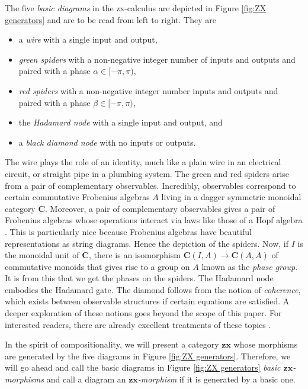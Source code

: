 \documentclass[11pt]{amsart}
\newcommand{\cat}[1]{\mathbf{#1}}
\theoremstyle{remark}
\theoremstyle{definition}
\begin{document}
The five \emph{basic diagrams} in the zx-calculus are depicted in Figure \ref{fig:ZX generators} and are to be read from left to right. They are
\begin{itemize}
	\item a \emph{wire} with a single input and output,
	\item \emph{green spiders} with a non-negative integer number of inputs and outputs and paired with a phase $\alpha \in [-\pi,\pi)$,
	\item \emph{red spiders} with a non-negative integer number inputs and outputs and paired with a phase $\beta \in [-\pi,\pi)$,
	\item the \emph{Hadamard node} with a single input and output, and
	\item a \emph{black diamond node} with no inputs or outputs.
\end{itemize}
The wire plays the role of an identity, much like a plain wire in an electrical circuit, or straight pipe in a plumbing system. The green and red spiders arise from a pair of complementary observables.  Incredibly, observables correspond to certain commutative Frobenius algebras $A$ living in a dagger symmetric monoidal category $\cat{C}$. Moreover, a pair of complementary observables gives a pair of Frobenius algebras whose operations interact via laws like those of a Hopf algebra \cite{CoeckePavlovic_QuantumMeasSums, CoeckePavVicary_OrthBasis}.  This is particularly nice because Frobenius algebras have beautiful representations as string diagrams. Hence the depiction of the spiders. Now, if $I$ is the monoidal unit of $\cat{C}$, there is an isomorphism $\cat{C}(I,A) \to \cat{C}(A,A)$ of commutative monoids that gives rise to a group on $A$ known as the \emph{phase group}.  It is from this that we get the phases on the spiders. The Hadamard node embodies the Hadamard gate. The diamond follows from the notion of \emph{coherence}, which exists between observable structures if certain equations are satisfied.  A deeper exploration of these notions goes beyond the scope of this paper.  For interested readers, there are already excellent treatments of these topics \cite{CoeckeDuncan_QuantumObsFullPaper}.

In the spirit of compositionality, we will present a category $\cat{zx}$ whose morphisms are generated by the five diagrams in Figure \ref{fig:ZX generators}. Therefore, we will go ahead and call the basic diagrams in Figure \ref{fig:ZX generators} \emph{basic $\cat{zx}$-morphisms} and call a diagram an \emph{$\cat{zx}$-morphism} if it is generated by a basic one.
\end{document}
